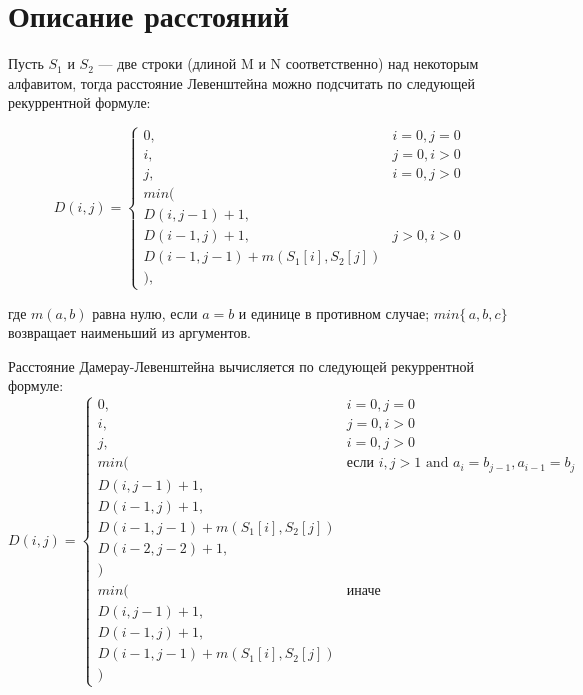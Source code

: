 \documentclass[12pt]{report}
\begin{document}
\section{Описание расстояний}
Пусть $S_{1}$ и $S_{2}$ — две строки (длиной M и N соответственно) над некоторым алфавитом, тогда расстояние Левенштейна можно подсчитать по следующей рекуррентной формуле:

\begin{displaymath}
D(i,j) = \left\{ \begin{array}{ll}
 0, & \textrm{$i = 0, j = 0$}\\
 i, & \textrm{$j = 0, i > 0$}\\
 j, & \textrm{$i = 0, j > 0$}\\
min(\\
D(i,j-1)+1,\\
D(i-1, j) +1, &\textrm{$j>0, i>0$}\\
D(i-1, j-1) + m(S_{1}[i], S_{2}[j])\\
),
  \end{array} \right.
\end{displaymath}

где $m(a,b)$ равна нулю, если $a=b$ и единице в противном случае; $min\{\,a,b,c\}$ возвращает наименьший из аргументов.

Расстояние Дамерау-Левенштейна вычисляется по следующей рекуррентной формуле:
\begin{displaymath}
D(i,j) = \left\{ \begin{array}{ll}
 0, & \textrm{$i = 0, j = 0$}\\
 i, & \textrm{$j = 0, i > 0$}\\
 j, & \textrm{$i = 0, j > 0$}\\
min(&\textrm{если $i,j>1$ and $a_{i} = b_{j-1},a_{i-1}=b_{j} $}\\
D(i,j-1)+1,\\
D(i-1, j) +1,\\
D(i-1, j-1) + m(S_{1}[i], S_{2}[j])\\
D(i-2, j-2) + 1,\\
)\\
min(&\textrm{иначе}\\
D(i,j-1)+1,\\
D(i-1, j) +1,\\
D(i-1, j-1) + m(S_{1}[i], S_{2}[j])\\
)
  \end{array} \right.
\end{displaymath}
\end{document}
